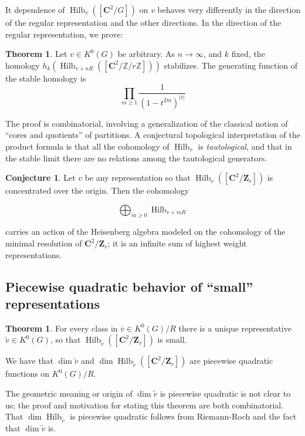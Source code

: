 \documentclass{amsart}[12pt]
\theoremstyle{definition}
\newtheorem{theorem}[dummy]{Theorem}
\newtheorem{conjecture}[dummy]{Conjecture}
\newcommand{\Z}{\mathbf{Z}}
\newcommand{\C}{\mathbf{C}}
\DeclareMathOperator{\Hilb}{Hilb}
\begin{document}
It dependence of $\Hilb_v([\C^2/G])$ on $v$ behaves very differently in the direction of the regular representation and the other directions.  In the direction of the regular representation, we prove:

\begin{theorem}
Let $v\in K^0(G)$ be arbitrary.  As $n\to \infty$, and $k$ fixed, the homology $h_k(\Hilb_{v+nR}([\C^2/\mathbb{Z}/r\mathbb{Z}]))$ stabilizes.  The generating function of the stable homology is
$$\prod_{m\geq 1} \frac{1}{(1-t^{2m})^{|r|}}$$
\end{theorem}

The proof is combinatorial, involving a generalization of the classical notion of ``cores and quotients'' of partitions.  A conjectural topological interpretation of the product formula is that all the cohomology of $\Hilb_v$ is \emph{tautological}, and that in the stable limit there are no relations among the tautological generators.


\begin{conjecture}
Let $v$ be any representation so that $\Hilb_v([\C^2/\Z_r])$ is concentrated over the origin.  Then the cohomology

$$\bigoplus_{m\geq 0} \Hilb_{v+mR} $$ 

carries an action of the Heisenberg algebra modeled on the cohomology of the minimal resolution of $\C^2/\Z_r$; it is an infinite sum of highest weight representations.
\end{conjecture}

\subsection{Piecewise quadratic behavior of ``small'' representations}


\begin{theorem}
For every class in $\overline{v}\in K^0(G)/R$ there is a unique representative $\tilde{v}\in K^0(G)$, so that $\Hilb_{\tilde{v}}([\C^2/\Z_r])$ is small.  

We have that $\dim \tilde{v}$ and $\dim \Hilb_{\tilde{v}}([\C^2/\Z_r])$ are piecewise quadratic functions on $K^0(G)/R$.
\end{theorem}

The geometric meaning or origin of $\dim \tilde{v}$ is piecewise quadratic is not clear to us; the proof and motivation for stating this theorem are both combinatorial.  That $\dim \Hilb_{\tilde{v}}$ is piecewise quadratic follows from Riemann-Roch and the fact that $\dim \tilde{v}$ is.    
\end{document}
